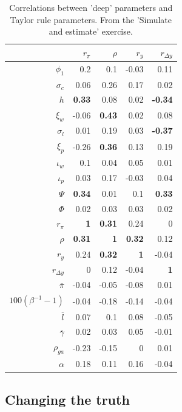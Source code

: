 \documentclass[11pt]{article}
\begin{document}
\begin{table}

\caption{\label{tab:covary-with-Taylor}Correlations between 'deep' parameters and Taylor rule parameters. From the 
             'Simulate and estimate' exercise.}
\centering
\begin{tabular}[t]{rrrrr}
\toprule
 & $r_\pi$ & $\rho$ & $r_y$ & $r_{\Delta y}$\\
\midrule
$\phi_1$ & 0.2 & 0.1 & -0.03 & 0.11\\
$\sigma_c$ & 0.06 & 0.26 & 0.17 & 0.02\\
$h$ & \textbf{0.33} & 0.08 & 0.02 & \textbf{-0.34}\\
$\xi_w$ & -0.06 & \textbf{0.43} & 0.02 & 0.08\\
$\sigma_l$ & 0.01 & 0.19 & 0.03 & \textbf{-0.37}\\
\addlinespace
$\xi_p$ & -0.26 & \textbf{0.36} & 0.13 & 0.19\\
$\iota_w$ & 0.1 & 0.04 & 0.05 & 0.01\\
$\iota_p$ & 0.03 & 0.17 & -0.03 & 0.04\\
$\Psi$ & \textbf{0.34} & 0.01 & 0.1 & \textbf{0.33}\\
$\Phi$ & 0.02 & 0.03 & 0.03 & 0.02\\
\addlinespace
$r_\pi$ & \textbf{1} & \textbf{0.31} & 0.24 & 0\\
$\rho$ & \textbf{0.31} & \textbf{1} & \textbf{0.32} & 0.12\\
$r_y$ & 0.24 & \textbf{0.32} & \textbf{1} & -0.04\\
$r_{\Delta y}$ & 0 & 0.12 & -0.04 & \textbf{1}\\
$\overline{\pi}$ & -0.04 & -0.05 & -0.08 & 0.01\\
\addlinespace
$100(\beta^{-1} -1)$ & -0.04 & -0.18 & -0.14 & -0.04\\
$\overline{l}$ & 0.07 & 0.1 & 0.08 & -0.05\\
$\overline{\gamma}$ & 0.02 & 0.03 & 0.05 & -0.01\\
$\rho_{ga}$ & -0.23 & -0.15 & 0 & 0.01\\
$\alpha$ & 0.18 & 0.11 & 0.16 & -0.04\\
\bottomrule
\end{tabular}
\end{table}

\hypertarget{changing-the-truth}{%
\subsection{Changing the truth}\label{changing-the-truth}}
\end{document}
